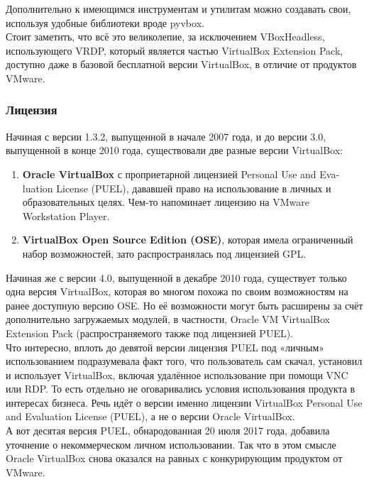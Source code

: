 \documentclass[14pt, a4paper]{article}
\begin{document}
Дополнительно к имеющимся инструментам и утилитам можно создавать свои, используя удобные
библиотеки вроде pyvbox.\\

Стоит заметить, что всё это великолепие, за исключением VBoxHeadless, использующего VRDP,
который является частью VirtualBox Extension Pack, доступно даже в базовой бесплатной версии
VirtualBox, в отличие от продуктов VMware.

\subsubsection*{Лицензия} 

Начиная с версии 1.3.2, выпущенной в начале 2007 года, и до версии 3.0, выпущенной в конце 2010
года, существовали две разные версии VirtualBox:

\begin{enumerate}
    \item \textbf{Oracle VirtualBox} с проприетарной лицензией Personal Use and Eva- luation License (PUEL),
    дававшей право на использование в личных и образовательных целях. Чем-то напоминает
    лицензию на VMware Workstation Player.
    \item \textbf{VirtualBox Open Source Edition (OSE)}, которая имела ограниченный набор возможностей,
    зато распространялась под лицензией GPL.
\end{enumerate}

Начиная же с версии 4.0, выпущенной в декабре 2010 года, существует только одна версия VirtualBox,
которая во многом похожа по своим возможностям на ранее доступную версию OSE. Но её
возможности могут быть расширены за счёт дополнительно загружаемых модулей, в частности,
Oracle VM VirtualBox Extension Pack (распространяемого также под лицензией PUEL).\\

Что интересно, вплоть до девятой версии лицензия PUEL под «личным» использованием
подразумевала факт того, что пользователь сам скачал, установил и использует VirtualBox, включая
удалённое использование при помощи VNC или RDP. То есть отдельно не оговаривались условия
использования продукта в интересах бизнеса. Речь идёт о версии именно лицензии VirtualBox
Personal Use and Evaluation License (PUEL), а не о версии Oracle VirtualBox.\\

А вот десятая версия PUEL, обнародованная 20 июля 2017 года, добавила уточнение о
некоммерческом личном использовании. Так что в этом смысле Oracle VirtualBox снова оказался на
равных с конкурирующим продуктом от VMware.\\
\end{document}
